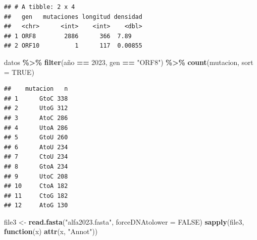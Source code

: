 \documentclass[
]{article}
\newenvironment{Shaded}{\begin{snugshade}}{\end{snugshade}}
\newcommand{\AttributeTok}[1]{\textcolor[rgb]{0.13,0.29,0.53}{#1}}
\newcommand{\ConstantTok}[1]{\textcolor[rgb]{0.56,0.35,0.01}{#1}}
\newcommand{\ControlFlowTok}[1]{\textcolor[rgb]{0.13,0.29,0.53}{\textbf{#1}}}
\newcommand{\DecValTok}[1]{\textcolor[rgb]{0.00,0.00,0.81}{#1}}
\newcommand{\FunctionTok}[1]{\textcolor[rgb]{0.13,0.29,0.53}{\textbf{#1}}}
\newcommand{\NormalTok}[1]{#1}
\newcommand{\OtherTok}[1]{\textcolor[rgb]{0.56,0.35,0.01}{#1}}
\newcommand{\SpecialCharTok}[1]{\textcolor[rgb]{0.81,0.36,0.00}{\textbf{#1}}}
\newcommand{\StringTok}[1]{\textcolor[rgb]{0.31,0.60,0.02}{#1}}
\begin{document}
\begin{verbatim}
## # A tibble: 2 x 4
##   gen   mutaciones longitud densidad
##   <chr>      <int>    <int>    <dbl>
## 1 ORF8        2886      366  7.89   
## 2 ORF10          1      117  0.00855
\end{verbatim}

\begin{Shaded}
\begin{Highlighting}[]
\NormalTok{datos }\SpecialCharTok{\%\textgreater{}\%}
  \FunctionTok{filter}\NormalTok{(año }\SpecialCharTok{==} \DecValTok{2023}\NormalTok{, gen }\SpecialCharTok{==} \StringTok{"ORF8"}\NormalTok{) }\SpecialCharTok{\%\textgreater{}\%}
  \FunctionTok{count}\NormalTok{(mutacion, }\AttributeTok{sort =} \ConstantTok{TRUE}\NormalTok{)}
\end{Highlighting}
\end{Shaded}

\begin{verbatim}
##    mutacion   n
## 1      GtoC 338
## 2      UtoG 312
## 3      AtoC 286
## 4      UtoA 286
## 5      GtoU 260
## 6      AtoU 234
## 7      CtoU 234
## 8      GtoA 234
## 9      UtoC 208
## 10     CtoA 182
## 11     CtoG 182
## 12     AtoG 130
\end{verbatim}

\begin{Shaded}
\begin{Highlighting}[]
\NormalTok{file3 }\OtherTok{\textless{}{-}} \FunctionTok{read.fasta}\NormalTok{(}\StringTok{"alfa2023.fasta"}\NormalTok{, }\AttributeTok{forceDNAtolower =} \ConstantTok{FALSE}\NormalTok{)}
\FunctionTok{sapply}\NormalTok{(file3, }\ControlFlowTok{function}\NormalTok{(x) }\FunctionTok{attr}\NormalTok{(x, }\StringTok{"Annot"}\NormalTok{))}
\end{Highlighting}
\end{Shaded}
\end{document}
